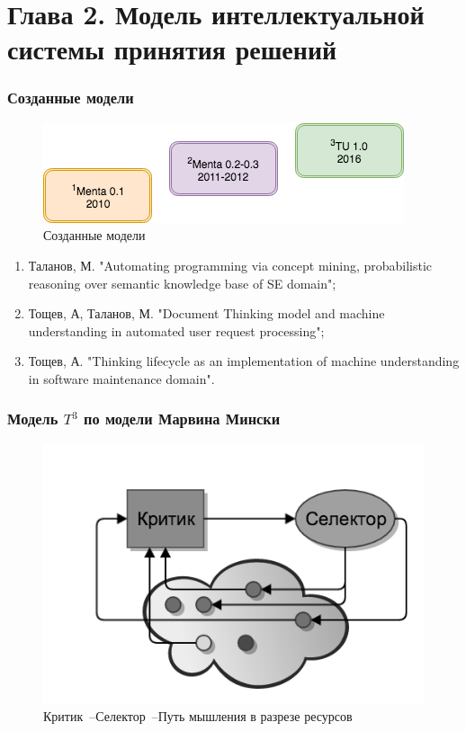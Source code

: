\documentclass[14pt]{beamer}
\begin{document}
%
\section[Глава 2]{Глава 2. Модель интеллектуальной системы принятия решений}
\begin{frame}
\frametitle{Созданные модели}
\begin{figure} [h] 
  \center 
  \includegraphics [scale=0.6] {ModelEvolution}
  \caption{Созданные модели} 
  \label{img:ModelEvolution} 
\end{figure}
\begin{minipage}{11cm}
\footnotesize 
\begin{enumerate}
	\item Таланов, М. "Automating programming via concept mining, probabilistic reasoning over semantic knowledge base of SE domain";
	\item Тощев, А, Таланов,  М. "Document Thinking model and machine understanding in automated user request processing";
	\item Тощев, А. "Thinking lifecycle as an implementation of machine understanding in software maintenance domain".
\end{enumerate}
\end{minipage}
\end{frame}


\begin{frame}
\frametitle{Модель $T^3$ по модели Марвина Мински}
\begin{figure} [h] 
  \center
  \includegraphics [scale=0.6] {CSW_EX}
  \caption{Критик~--Селектор~--Путь мышления в разрезе ресурсов} 
  \label{img:csw_ex} 
\end{figure}
\end{frame}
\end{document}
